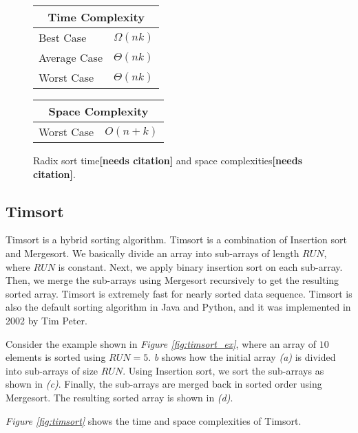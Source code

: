 \begin{figure}[!ht]
    \centering
    \begin{tabular}{l|l}
    \multicolumn{2}{c}{\textbf{Time Complexity}} \\
    \hline
    Best Case    & $\Omega(n k)$ \\
    Average Case & $\Theta(n k)$ \\
    Worst Case   & $\Theta(n k)$ \\
    \end{tabular}
    \quad\quad
    \begin{tabular}{l|l}
    \multicolumn{2}{c}{\textbf{Space Complexity}} \\
    \hline
    Worst Case   & $O(n + k)$
    \end{tabular}
    
    \caption{Radix sort time\textbf{[needs citation]} and space complexities\textbf{[needs citation]}.}
    \label{fig:radixsort}
\end{figure}


\subsection{Timsort}

Timsort is a hybrid sorting algorithm. Timsort is a combination of Insertion sort and Mergesort. We basically divide an array into sub-arrays of length $RUN$, where $RUN$ is constant. Next, we apply binary insertion sort on each sub-array. Then, we merge the sub-arrays using Mergesort recursively to get the resulting sorted array. Timsort is extremely fast for nearly sorted data sequence. Timsort is also the default sorting algorithm in Java and Python, and it was implemented in 2002 by Tim Peter. 

Consider the example shown in \textit{Figure \ref{fig:timsort_ex}}, where an array of $10$ elements is sorted using $RUN=5$. \textit{{b}} shows how the initial array \textit{(a)} is divided into sub-arrays of size $RUN$. Using Insertion sort, we sort the sub-arrays as shown in \textit{(c)}. Finally, the sub-arrays are merged back in sorted order using Mergesort. The resulting sorted array is shown in \textit{(d)}.

\textit{Figure \ref{fig:timsort}} shows the time and space complexities of Timsort.

